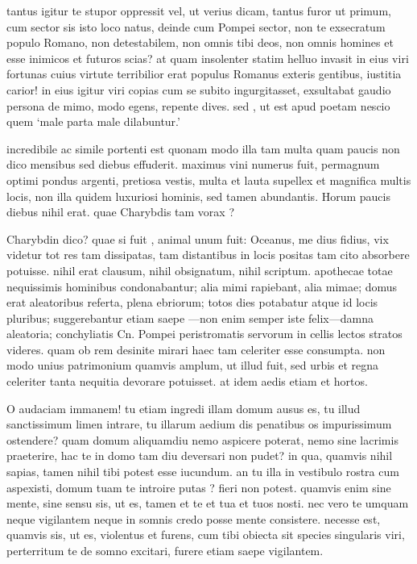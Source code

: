  tantus igitur te stupor oppressit vel, ut verius dicam, tantus furor ut primum, cum sector sis isto loco natus, deinde cum Pompei sector, non te exsecratum populo Romano, non detestabilem, non omnis tibi deos, non omnis homines et esse inimicos et futuros scias? at quam insolenter statim helluo invasit in eius viri fortunas cuius virtute terribilior erat populus Romanus exteris gentibus, iustitia carior! in eius igitur viri copias cum se subito ingurgitasset, exsultabat gaudio persona de mimo, modo egens, repente dives. sed , ut est apud poetam nescio quem `male parta male dilabuntur.'

 incredibile ac simile portenti est quonam modo illa tam multa quam paucis non dico mensibus sed diebus effuderit. maximus vini numerus fuit, permagnum optimi pondus argenti, pretiosa vestis, multa et lauta supellex et magnifica multis locis, non illa quidem luxuriosi hominis, sed tamen abundantis. Horum paucis diebus nihil erat. quae Charybdis tam vorax ?

 Charybdin dico? quae si fuit , animal unum fuit: Oceanus, me dius fidius, vix videtur tot res tam dissipatas, tam distantibus in locis positas tam cito absorbere potuisse. nihil erat clausum, nihil obsignatum, nihil scriptum. apothecae totae nequissimis hominibus condonabantur; alia mimi rapiebant, alia mimae; domus erat aleatoribus referta, plena ebriorum; totos dies potabatur atque id locis pluribus; suggerebantur etiam saepe —non enim semper iste felix—damna aleatoria; conchyliatis Cn. Pompei peristromatis servorum in cellis lectos stratos videres. quam ob rem desinite mirari haec tam celeriter esse consumpta. non modo unius patrimonium quamvis amplum, ut illud fuit, sed urbis et regna celeriter tanta nequitia devorare potuisset. at idem aedis etiam et hortos.

 O audaciam immanem! tu etiam ingredi illam domum ausus es, tu illud sanctissimum limen intrare, tu illarum aedium dis penatibus os impurissimum ostendere? quam domum aliquamdiu nemo aspicere poterat, nemo sine lacrimis praeterire, hac te in domo tam diu deversari non pudet? in qua, quamvis nihil sapias, tamen nihil tibi potest esse iucundum. an tu illa in vestibulo rostra cum aspexisti, domum tuam te introire putas ? fieri non potest. quamvis enim sine mente, sine sensu sis, ut es, tamen et te et tua et tuos nosti. nec vero te umquam neque vigilantem neque in somnis credo posse mente consistere. necesse est, quamvis sis, ut es, violentus et furens, cum tibi obiecta sit species singularis viri, perterritum te de somno excitari, furere etiam saepe vigilantem.

